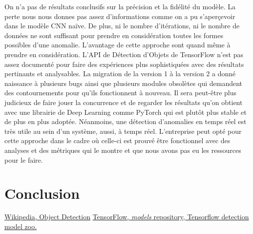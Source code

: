 \documentclass[french]{article}
\theoremstyle{mytheoremstyle}
\theoremstyle{mytheoremstyle}
\theoremstyle{myproblemstyle}
\begin{document}
    \indent On n'a pas de résultats conclusifs sur la précision et la fidélité du modèle. La perte nous nous donnes pas assez d'informations comme on a pu s'aperçevoir dans le modèle CNN naïve. De plus, ni le nombre d'itérations, ni le nombre de données ne sont suffisant pour prendre en considération toutes les formes possibles d'une anomalie. L'avantage de cette approche sont quand même à prendre en considération. L'API de Détection d'Objets de TensorFlow n'est pas assez documenté pour faire des expériences plus sophistiquées avec des résultats pertinants et analysables. La migration de la version 1 à la version 2 a donné naissance à plusieurs bugs ainsi que plusieurs modules obsolètes qui demandent des contournements pour qu'ils fonctionnent à nouveau. Il sera peut-être plus judicieux de faire jouer la concurrence et de regarder les résultats qu'on obtient avec une librairie de Deep Learning comme PyTorch qui est plutôt plus stable et de plus en plus adoptée.
    \newline
    \indent Néanmoins, une détection d'anomalies en temps réel est très utile au sein d'un système, aussi, à temps réel. L'entreprise peut opté pour cette approche dans le cadre où celle-ci est prouvé être fonctionnel avec des analyses et des métriques qui le montre et que nous avons pas eu les ressources pour le faire.
    \section{Conclusion}

\renewcommand\refname{7\indent Références}
\begin{thebibliography}{1}
 \href{https://en.wikipedia.org/wiki/Object\_detection}{Wikipedia, Object Detection}
 \href{https://github.com/tensorflow/models/blob/master/research/object_detection/g3doc/detection_model_zoo.md#coco-trained-models}{TensorFlow, \textit{models} repository, Tensorflow detection model zoo.}
\end{thebibliography}
\end{document}
